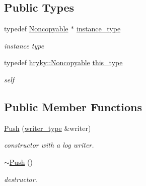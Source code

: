 \subsection*{Public Types}
\begin{DoxyCompactItemize}
\item 
\hypertarget{classhryky_1_1_noncopyable_aaf87abb55f700af85ecb0895f6178821}{typedef \hyperlink{classhryky_1_1_noncopyable}{Noncopyable} $\ast$ \hyperlink{classhryky_1_1_noncopyable_aaf87abb55f700af85ecb0895f6178821}{instance\-\_\-type}}\label{classhryky_1_1_noncopyable_aaf87abb55f700af85ecb0895f6178821}

\begin{DoxyCompactList}\small\item\em instance type \end{DoxyCompactList}\item 
\hypertarget{classhryky_1_1_noncopyable_acf13ad1c98a76247a561dff514979da5}{typedef \hyperlink{classhryky_1_1_noncopyable}{hryky\-::\-Noncopyable} \hyperlink{classhryky_1_1_noncopyable_acf13ad1c98a76247a561dff514979da5}{this\-\_\-type}}\label{classhryky_1_1_noncopyable_acf13ad1c98a76247a561dff514979da5}

\begin{DoxyCompactList}\small\item\em self \end{DoxyCompactList}\end{DoxyCompactItemize}
\subsection*{Public Member Functions}
\begin{DoxyCompactItemize}
\item 
\hypertarget{structhryky_1_1log_1_1writer_1_1_push_adba8c36516d5f2d9fe6e53e6f8ede057}{\hyperlink{structhryky_1_1log_1_1writer_1_1_push_adba8c36516d5f2d9fe6e53e6f8ede057}{Push} (\hyperlink{classhryky_1_1log_1_1writer_1_1_base}{writer\-\_\-type} \&writer)}\label{structhryky_1_1log_1_1writer_1_1_push_adba8c36516d5f2d9fe6e53e6f8ede057}

\begin{DoxyCompactList}\small\item\em constructor with a log writer. \end{DoxyCompactList}\item 
\hypertarget{structhryky_1_1log_1_1writer_1_1_push_a3fce2613648599bac54658a141d38275}{\hyperlink{structhryky_1_1log_1_1writer_1_1_push_a3fce2613648599bac54658a141d38275}{$\sim$\-Push} ()}\label{structhryky_1_1log_1_1writer_1_1_push_a3fce2613648599bac54658a141d38275}

\begin{DoxyCompactList}\small\item\em destructor. \end{DoxyCompactList}\end{DoxyCompactItemize}


